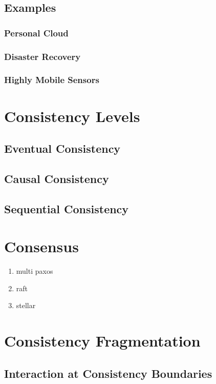 \documentclass[letterpaper,twocolumn,10pt]{article}
\begin{document}
\subsection{Examples}

\subsubsection{Personal Cloud}
\subsubsection{Disaster Recovery}
\subsubsection{Highly Mobile Sensors}

\section{Consistency Levels}

\subsection{Eventual Consistency}

\subsection{Causal Consistency}

\subsection{Sequential Consistency}

\section{Consensus}

\begin{enumerate}
    \item multi paxos
    \item raft
    \item stellar
\end{enumerate}

\section{Consistency Fragmentation}

\subsection{Interaction at Consistency Boundaries}
\end{document}
